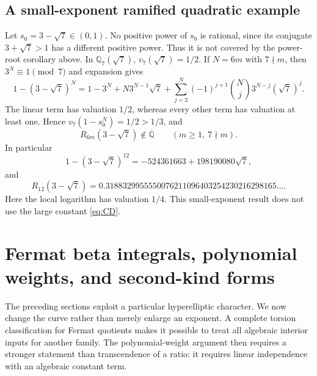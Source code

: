 \documentclass[11pt,a4paper]{article}
\numberwithin{equation}{section}
\theoremstyle{definition}
\theoremstyle{remark}
\newcommand{\Q}{\mathbb Q}
\newcommand{\Qb}{\overline{\mathbb Q}}
\begin{document}
\subsection{A small-exponent ramified quadratic example}
Let $s_0=3-\sqrt7\in(0,1)$. No positive power of $s_0$ is rational, since
its conjugate $3+\sqrt7>1$ has a different positive power. Thus it is not
covered by the power-root corollary above.
In $\Q_7(\sqrt7)$, $v_7(\sqrt7)=1/2$. If $N=6m$ with $7\nmid m$,
then $3^N\equiv1\pmod7$ and expansion gives
\[
 1-(3-\sqrt7)^N=1-3^N+N3^{N-1}\sqrt7+
 \sum_{j=2}^N(-1)^{j+1}\binom Nj3^{N-j}(\sqrt7)^j.
\]
The linear term has valuation $1/2$, whereas every other term has valuation
at least one. Hence $v_7(1-s_0^N)=1/2>1/3$, and
\begin{equation}
 R_{6m}(3-\sqrt7)\notin\Qb\qquad(m\ge1,\ 7\nmid m).
\end{equation}
In particular
\[
 1-(3-\sqrt7)^{12}=-524361663+198190080\sqrt7,
\]
and
\[
 R_{12}(3-\sqrt7)=0.3188329955550076211096403254230216298165\ldots.
\]
Here the local logarithm has valuation $1/4$. This small-exponent result
does not use the large constant \eqref{eq:CD}.

\section{Fermat beta integrals, polynomial weights, and second-kind forms}\label{sec:fermat}
The preceding sections exploit a particular hyperelliptic character. We now
change the curve rather than merely enlarge an exponent. A complete torsion
classification for Fermat quotients makes it possible to treat all algebraic
interior inputs for another family. The polynomial-weight argument then
requires a stronger statement than transcendence of a ratio: it requires
linear independence with an algebraic constant term.
\end{document}
